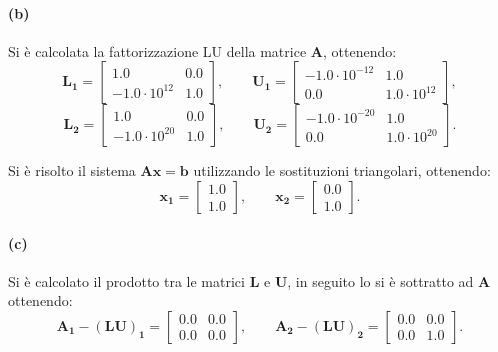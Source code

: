 \documentclass[letterpaper, 12pt]{article}
\numberwithin{equation}{section}    %
\begin{document}
\paragraph{(b)} \label{par:fattorizzazione_LU} Si è calcolata la fattorizzazione LU della matrice $\mathbf{A}$, 
ottenendo:
\begin{equation*}
    \mathbf{L_1} = \begin{bmatrix}
    1.0      &  0.0 \\
    -1.0 \cdot 10^{12}  &  1.0 
    \end{bmatrix}, \qquad
    \mathbf{U_1} = \begin{bmatrix}
    -1.0 \cdot 10^{-12}  &  1.0               \\
     0.0                 &  1.0 \cdot 10^{12}
    \end{bmatrix},
\end{equation*}
\begin{equation*}
    \mathbf{L_2} = \begin{bmatrix}
    1.0                 &  0.0 \\
    -1.0 \cdot 10^{20}  &  1.0
    \end{bmatrix}, \qquad
    \mathbf{U_2} = \begin{bmatrix}
    -1.0 \cdot 10^{-20}  &  1.0 \\
     0.0                 &  1.0 \cdot 10^{20}
    \end{bmatrix}.
\end{equation*}

Si è risolto il sistema $\mathbf{Ax} = \mathbf{b}$ utilizzando le sostituzioni triangolari, ottenendo:
\begin{equation*}
    \mathbf{x_1} = \begin{bmatrix}
        1.0 \\
        1.0
    \end{bmatrix}, 
    \qquad
    \mathbf{x_2} = \begin{bmatrix}
        0.0 \\
        1.0
    \end{bmatrix}.
\end{equation*}

\paragraph{(c)}Si è calcolato il prodotto tra le matrici $\mathbf{L}$ e $\mathbf{U}$, in seguito lo si è 
sottratto ad $\mathbf{A}$ ottenendo:
\begin{equation*}
    \mathbf{A_1} - \mathbf{(LU)_1} = \begin{bmatrix}
        0.0 & 0.0 \\
        0.0 & 0.0
    \end{bmatrix}, 
    \qquad
    \mathbf{A_2} - \mathbf{(LU)_2} = \begin{bmatrix}
        0.0 & 0.0 \\
        0.0 & 1.0
    \end{bmatrix}.
\end{equation*}
\end{document}

